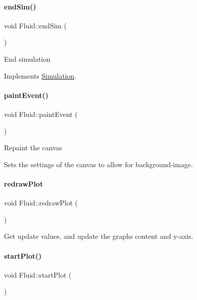 \paragraph{\texorpdfstring{endSim()}{endSim()}}
{\footnotesize\ttfamily void Fluid\+::end\+Sim (\begin{DoxyParamCaption}{ }\end{DoxyParamCaption})\hspace{0.3cm}{\ttfamily [virtual]}}

End simulation 

Implements \mbox{\hyperlink{classSimulation_ab496d124202f55e741db7db9a304a7ee}{Simulation}}.

\mbox{\label{classFluid_a9f4b99a8c95a81cce3c0463607a997bb}} 
\paragraph{\texorpdfstring{paintEvent()}{paintEvent()}}
{\footnotesize\ttfamily void Fluid\+::paint\+Event (\begin{DoxyParamCaption}\item[{Q\+Paint\+Event $\ast$}]{ }\end{DoxyParamCaption})}

Repaint the canvas

Sets the settings of the canvas to allow for background-\/image. \mbox{\label{classFluid_a020c8985824d3d7be033cb2916d77c24}} 
\paragraph{\texorpdfstring{redrawPlot}{redrawPlot}}
{\footnotesize\ttfamily void Fluid\+::redraw\+Plot (\begin{DoxyParamCaption}{ }\end{DoxyParamCaption})\hspace{0.3cm}{\ttfamily [slot]}}

Get update values, and update the graph\textquotesingle{}s content and y-\/axis. \mbox{\label{classFluid_ae7c7a362e1c6fcf2c88bfbf8f1836a52}} 
\paragraph{\texorpdfstring{startPlot()}{startPlot()}}
{\footnotesize\ttfamily void Fluid\+::start\+Plot (\begin{DoxyParamCaption}{ }\end{DoxyParamCaption})}

